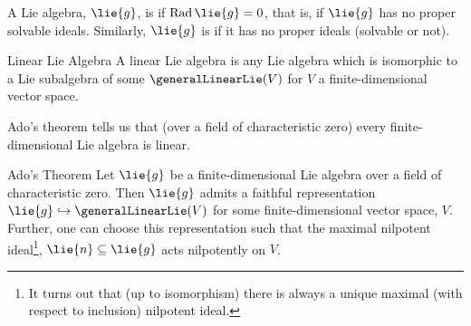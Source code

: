 \documentclass[fleqn]{NotesClass}
\DeclareMathOperator{\Rad}{Rad}
\begin{document}
    \begin{dfn}{}{}
        A Lie algebra, \(\lie{g}\), is  if \(\Rad \lie{g} = 0\), that is, if \(\lie{g}\) has no proper solvable ideals.
        Similarly, \(\lie{g}\) is  if it has no proper ideals (solvable or not).
    \end{dfn}
    
    \begin{dfn}{Linear Lie Algebra}{}
        A linear Lie algebra is any Lie algebra which is isomorphic to a Lie subalgebra of some \(\generalLinearLie(V)\) for \(V\) a finite-dimensional vector space.
    \end{dfn}
    
    Ado's theorem tells us that (over a field of characteristic zero) every finite-dimensional Lie algebra is linear.
    
    \begin{thm}{Ado's Theorem}{}
        Let \(\lie{g}\) be a finite-dimensional Lie algebra over a field of characteristic zero.
        Then \(\lie{g}\) admits a faithful representation \(\lie{g} \hookrightarrow \generalLinearLie(V)\) for some finite-dimensional vector space, \(V\).
        Further, one can choose this representation such that the maximal nilpotent ideal\footnote{ %
        It turns out that (up to isomorphism) there is always a unique maximal (with respect to inclusion) nilpotent ideal.}, \(\lie{n} \subseteq \lie{g}\) acts nilpotently on \(V\).
    \end{thm}
    
\end{document}

